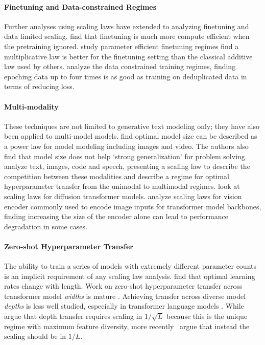 \documentclass{article}
\begin{document}
\paragraph{Finetuning and Data-constrained Regimes}
Further analyses using scaling laws have extended to analyzing finetuning and data limited scaling.
\citet{hernandez2021scaling} find that finetuning is much more compute efficient when the pretraining ignored.
\citet{zhang2024scaling} study parameter efficient finetuning regimes find a multiplicative law is better for the finetuning setting than the classical additive law used by others.
\citet{muennighoff2023scaling} analyze the data constrained training regimes, finding epoching data up to four times is as good as training on deduplicated data in terms of reducing loss.

\paragraph{Multi-modality}
These techniques are not limited to generative text modeling only; they have also been applied to multi-model models.
\citet{henighan2020scaling} find optimal model size can be described as a power law for model modeling including images and video. 
The authors also find that model size does not help `strong generalization' for problem solving.
\citet{aghajanyan2023scaling} analyze text, images, code and speech, presenting a scaling law to describe the competition between these modalities and describe a regime for optimal hyperparameter transfer from the unimodal to multimodal regimes.
\citet{liang2024scaling} look at scaling laws for diffusion transformer models.
\citet{li2024bigger} analyze scaling laws for vision encoder commonly used to encode image inputs for transformer model backbones, finding increasing the size of the encoder alone can lead to performance degradation in some cases.


\paragraph{Zero-shot Hyperparameter Transfer}\label{sec:mup-relwork}
The ability to train a series of models with extremely different parameter counts is an implicit requirement of any scaling law analysis. 
\citet{bjorck2024scaling} find that optimal learning rates change with length.
Work on zero-shot hyperparameter transfer across transformer model \textit{widths} is mature \citep{yang2021zero,everett2024scaling,hayou2023width,cerebras2024mupguide}.
Achieving transfer across diverse model \textit{depths} is less well studied, especially in transformer language models \citep{bordelon2024depthwise, yang2021tensor, yang2023tensor}. 
While~\citet{yang2023tensor} argue that depth transfer requires scaling in \(1/\sqrt{L}\) because this is the unique regime with maximum feature diversity, more recently~\citet{dey2025dontlazycompletepenables} argue that instead the scaling should be in \(1/L\).
\end{document}
